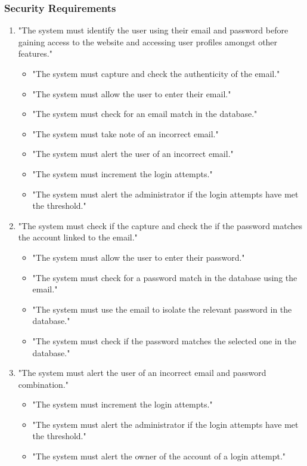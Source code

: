 \documentclass[12pt,a4paper]{article}
\begin{document}
		\subsubsection*{Security Requirements}
			\begin{enumerate}
				\item  "The system must identify the user using their email and password before gaining access to the website and accessing user profiles amongst other features."
				\begin{itemize}
					\item "The system must capture and check the authenticity of the email."
					\item  "The system must allow the user to enter their email."
					\item "The system must check for an email match in the database."
					\item "The system must take note of an incorrect email."
					\item "The system must alert the user of an incorrect email."
					\item "The system must increment the login attempts."
					\item "The system must alert the administrator if the login attempts have met the threshold."
				\end{itemize}
				\item "The system must check if the capture and check the if the password matches the account linked to the email."
					\begin{itemize}
						 \item "The system must allow the user to enter their password."
						\item "The system must check for a password match in the database using the email."
						\item "The system must use the email to isolate the relevant password in the database."
						\item "The system must check if the password matches the selected one in the database."
					\end{itemize}
				\item "The system must alert the user of an incorrect email and password combination."
				\begin{itemize}
					\item "The system must increment the login attempts."
					\item "The system must alert the administrator if the login attempts have met the threshold."
					\item "The system must alert the owner of the account of a login attempt."
				\end{itemize}
			\end{enumerate}
\end{document}
